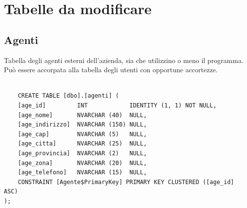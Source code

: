 \documentclass[12pt]{article}
\begin{document}
\section{Tabelle da modificare}

\subsection{Agenti}
Tabella degli agenti esterni dell'azienda, sia che utilizzino o meno il programma.
Può essere accorpata alla tabella degli utenti con opportune accortezze.
\begin{lstlisting}

    CREATE TABLE [dbo].[agenti] (
    [age_id]         INT            IDENTITY (1, 1) NOT NULL,
    [age_nome]       NVARCHAR (40)  NULL,
    [age_indirizzo]  NVARCHAR (150) NULL,
    [age_cap]        NVARCHAR (5)   NULL,
    [age_citta]      NVARCHAR (25)  NULL,
    [age_provincia]  NVARCHAR (2)   NULL,
    [age_zona]       NVARCHAR (20)  NULL,
    [age_telefono]   NVARCHAR (15)  NULL,
    CONSTRAINT [Agente$PrimaryKey] PRIMARY KEY CLUSTERED ([age_id] ASC)
); 
\end{lstlisting}
\end{document}
